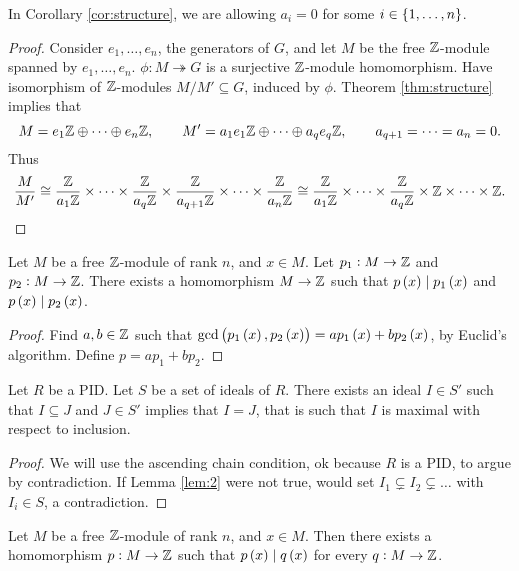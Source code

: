 \begin{remark*}
In Corollary \ref{cor:structure}, we are allowing $ a_i = 0 $ for some $ i \in \cbr{1, \dots, n} $.
\end{remark*}

\begin{proof}
Consider $ e_1, \dots, e_n $, the generators of $ G $, and let $ M $ be the free $ \mathbb{Z} $-module spanned by $ e_1, \dots, e_n $. $ \phi : M \twoheadrightarrow G $ is a surjective $ \mathbb{Z} $-module homomorphism. Have isomorphism of $ \mathbb{Z} $-modules $ M / M' \subseteq G $, induced by $ \phi $. Theorem \ref{thm:structure} implies that
$$ M = e_1\mathbb{Z} \oplus \dots \oplus e_n\mathbb{Z}, \qquad M' = a_1e_1\mathbb{Z} \oplus \dots \oplus a_qe_q\mathbb{Z}, \qquad a_{q + 1} = \dots = a_n = 0. $$
Thus
$$ \dfrac{M}{M'} \cong \dfrac{\mathbb{Z}}{a_1\mathbb{Z}} \times \dots \times \dfrac{\mathbb{Z}}{a_q\mathbb{Z}} \times \dfrac{\mathbb{Z}}{a_{q + 1}\mathbb{Z}} \times \dots \times \dfrac{\mathbb{Z}}{a_n\mathbb{Z}} \cong \dfrac{\mathbb{Z}}{a_1\mathbb{Z}} \times \dots \times \dfrac{\mathbb{Z}}{a_q\mathbb{Z}} \times \mathbb{Z} \times \dots \times \mathbb{Z}. $$
\end{proof}

\begin{lemma}
\label{lem:1}
Let $ M $ be a free $ \mathbb{Z} $-module of rank $ n $, and $ x \in M $. Let $ p_1 : M \to \mathbb{Z} $ and $ p_2 : M \to \mathbb{Z} $. There exists a homomorphism $ M \to \mathbb{Z} $ such that $ p\br{x} \mid p_1\br{x} $ and $ p\br{x} \mid p_2\br{x} $.
\end{lemma}

\begin{proof}
Find $ a, b \in \mathbb{Z} $ such that $ \gcd\br{p_1\br{x}, p_2\br{x}} = ap_1\br{x} + bp_2\br{x} $, by Euclid's algorithm. Define $ p = ap_1 + bp_2 $.
\end{proof}

\begin{lemma}
\label{lem:2}
Let $ R $ be a PID. Let $ S $ be a set of ideals of $ R $. There exists an ideal $ I \in S' $ such that $ I \subseteq J $ and $ J \in S' $ implies that $ I = J $, that is such that $ I $ is maximal with respect to inclusion.
\end{lemma}

\begin{proof}
We will use the ascending chain condition, ok because $ R $ is a PID, to argue by contradiction. If Lemma \ref{lem:2} were not true, would set $ I_1 \subsetneq I_2 \subsetneq \dots $ with $ I_i \in S $, a contradiction.
\end{proof}

\begin{lemma}
\label{lem:3}
Let $ M $ be a free $ \mathbb{Z} $-module of rank $ n $, and $ x \in M $. Then there exists a homomorphism $ p : M \to \mathbb{Z} $ such that $ p\br{x} \mid q\br{x} $ for every $ q : M \to \mathbb{Z} $.
\end{lemma}

